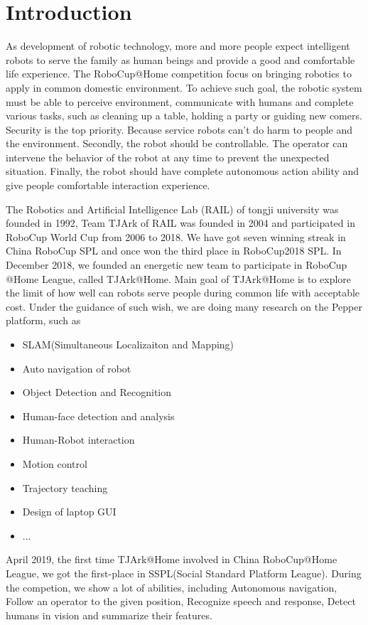 \section{Introduction}
As development of robotic technology, more and more people expect intelligent robots to serve the family as human beings and provide a good and comfortable life experience. The RoboCup@Home competition \cite{inproceedings} focus on bringing robotics to apply in common domestic environment. To achieve such goal, the robotic system must be able to perceive environment, communicate with humans and complete various tasks, such as cleaning up a table, holding a party or guiding new comers. Security is the top priority. Because service robots can't do harm to people and the environment. Secondly, the robot should be controllable. The operator can intervene the behavior of the robot at any time to prevent the unexpected situation. Finally, the robot should have complete autonomous action ability and give people comfortable interaction experience. 

The Robotics and Artificial Intelligence Lab (RAIL) of tongji university was founded in 1992, Team TJArk of RAIL was founded in 2004 and participated in RoboCup World Cup from 2006 to 2018. We have got seven winning streak in China RoboCup SPL and once won the third place in RoboCup2018 SPL.
In December 2018, we founded an energetic new team to participate in RoboCup @Home League, called TJArk@Home. Main goal of TJArk@Home is to explore the limit of how well can robots serve people during common life with acceptable cost. Under the guidance of such wish, we are doing many research on the Pepper platform, such as
\begin{itemize}
\item SLAM(Simultaneous Localizaiton and Mapping)
\item Auto navigation of robot
\item Object Detection and Recognition
\item Human-face detection and analysis
\item Human-Robot interaction
\item Motion control
\item Trajectory teaching
\item Design of laptop GUI
\item ...
\end{itemize}
April 2019,  the first time TJArk@Home involved in China RoboCup@Home League, we got the first-place in SSPL(Social Standard Platform League). 
During the competion, we show a lot of abilities, including 
Autonomous navigation, 
Follow an operator to the given position, 
Recognize speech and response, 
Detect humans in vision and summarize their features. 

